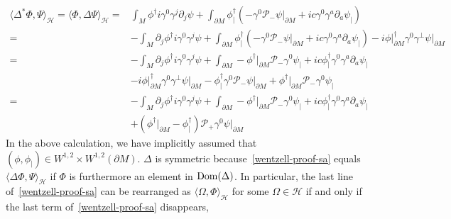 \begin{equation}\label{wentzell-proof-sa}
\begin{split}
\langle \Delta^*\Phi, \Psi \rangle_\mathcal{H} =
\langle \Phi, \Delta \Psi \rangle _\mathcal{H}
 = & \int_M \phi^\dagger i \gamma^0 \gamma^j \partial_j \psi 
+ \int_{\partial M} \phi^\dagger_|(  -\gamma^0\mathcal{P}_- \psi\vert_{\partial M} + ic \gamma^0 \gamma^a \partial_a\psi_|)   \\
 = & - \int_M \partial_j \phi^\dagger i \gamma^0 \gamma^j \psi 
+ \int_{\partial M} \phi^\dagger_|(-\gamma^0 \mathcal{P}_- \psi\vert_{\partial M} + ic \gamma^0 \gamma^a \partial_a  \psi_|) 
- i\phi\vert_{\partial M}^\dagger \gamma^0 \gamma^\bot \psi\vert_{\partial M}   \\
= &
- \int_M \partial_j \phi^\dagger i \gamma^0 \gamma^j \psi 
+ \int_{\partial M} - \phi^\dagger\vert_{\partial M}\mathcal{P}_- \gamma^0 \psi_| + ic \phi^\dagger_|\gamma^0 \gamma^a \partial_a  \psi_|  \\
& - i \phi\vert_{\partial M}^\dagger \gamma^0 \gamma^\bot \psi\vert_{\partial M} 
-\phi_|^\dagger \gamma^0 \mathcal{P}_- \psi\vert_{\partial M} 
+ \phi^\dagger\vert_{\partial M}\mathcal{P}_- \gamma^0 \psi_| \\
= &
- \int_M \partial_j \phi^\dagger i \gamma^0 \gamma^j \psi 
+ \int_{\partial M} - \phi^\dagger\vert_{\partial M}\mathcal{P}_- \gamma^0 \psi_| + ic \phi^\dagger_|\gamma^0 \gamma^a \partial_a  \psi_| \\
& + (\phi^\dagger\vert_{\partial M} - \phi_|^\dagger)\mathcal{P}_+ \gamma^0 \psi\vert_{\partial M}
\end{split}
\end{equation}
In the above calculation, we have implicitly assumed that $(\phi, \phi_|)\in W^{1,2}\times W^{1,2}(\partial M)$.
$\Delta$ is symmetric because~\cref{wentzell-proof-sa} equals $\langle \Delta\Phi, \Psi\rangle_\mathcal{H}$ if $\Phi$ is furthermore an element in $\mathrm{Dom}(\Delta)$.
In particular, the last line of~\cref{wentzell-proof-sa} can be rearranged as $\langle\Omega,\Phi\rangle_\mathcal{H}$ for some $\Omega\in\mathcal{H}$ if and only if the last term of~\cref{wentzell-proof-sa} disappears, \ie
